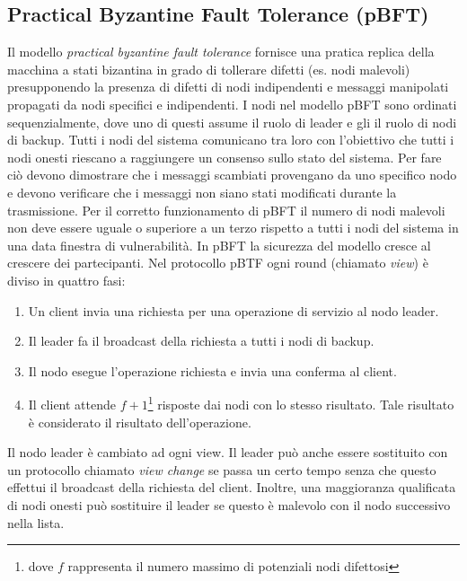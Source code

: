 \subsection{Practical Byzantine Fault Tolerance (pBFT)}
Il modello \textit{practical byzantine fault tolerance} fornisce una pratica replica della macchina a stati
bizantina in grado di tollerare difetti (es. nodi malevoli) presupponendo la presenza di difetti
di nodi indipendenti e messaggi manipolati propagati da nodi specifici e indipendenti.
I nodi nel modello pBFT sono ordinati sequenzialmente, dove uno di questi assume il ruolo di leader
e gli il ruolo di nodi di backup. Tutti i nodi del sistema comunicano tra loro
con l'obiettivo che tutti i nodi onesti riescano a raggiungere un consenso sullo stato del sistema.
Per fare ciò devono dimostrare che i messaggi scambiati provengano da uno specifico nodo e devono
verificare che i messaggi non siano stati modificati durante la trasmissione.
Per il corretto funzionamento di pBFT il numero di nodi malevoli non deve essere uguale o superiore
a un terzo rispetto a tutti i nodi del sistema in una data finestra di vulnerabilità.
In pBFT la sicurezza del modello cresce al crescere dei partecipanti.
Nel protocollo pBTF ogni round (chiamato \textit{view}) è diviso in quattro fasi:
\begin{enumerate}
	\item Un client invia una richiesta per una operazione di servizio al nodo leader.
	\item Il leader fa il broadcast della richiesta a tutti i nodi di backup.
	\item Il nodo esegue l'operazione richiesta e invia una conferma al client.
	\item Il client attende $ f + 1 $\footnote{dove $ f $ rappresenta
		      il numero massimo di potenziali nodi difettosi} risposte dai nodi con lo stesso risultato.
	      Tale risultato è considerato il risultato dell'operazione.
\end{enumerate}
Il nodo leader è cambiato ad ogni view. Il leader può anche essere sostituito con un protocollo chiamato
\textit{view change} se passa un certo tempo senza che questo effettui il broadcast
della richiesta del client. Inoltre, una maggioranza qualificata di nodi onesti può sostituire il leader
se questo è malevolo con il nodo successivo nella lista.

